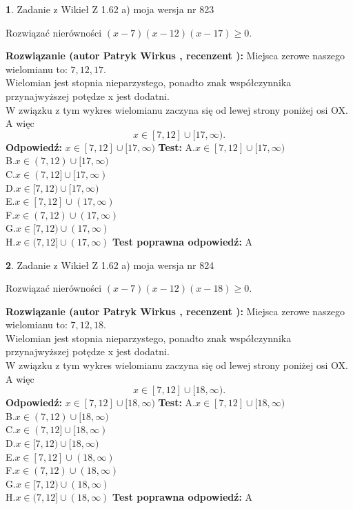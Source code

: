 \documentclass[12pt, a4paper]{article}
\theoremstyle{definition} %
\newtheorem{zad}{}
\newcommand{\zadStart}[1]{\begin{zad}#1\newline}
\newcommand{\zadStop}{\end{zad}}
\newcommand{\rozwStart}[2]{\noindent \textbf{Rozwiązanie (autor #1 , recenzent #2): }\newline}
\newcommand{\rozwStop}{\newline}
\newcommand{\odpStart}{\noindent \textbf{Odpowiedź:}\newline}
\newcommand{\odpStop}{\newline}
\newcommand{\testStart}{\noindent \textbf{Test:}\newline}
\newcommand{\testStop}{\newline}
\newcommand{\kluczStart}{\noindent \textbf{Test poprawna odpowiedź:}\newline}
\newcommand{\kluczStop}{\newline}
\begin{document}
\zadStart{Zadanie z Wikieł Z 1.62 a) moja wersja nr 823}

Rozwiązać nierówności $(x-7)(x-12)(x-17)\ge0$.
\zadStop
\rozwStart{Patryk Wirkus}{}
Miejsca zerowe naszego wielomianu to: $7, 12, 17$.\\
Wielomian jest stopnia nieparzystego, ponadto znak współczynnika przy\linebreak najwyższej potędze x jest dodatni.\\ W związku z tym wykres wielomianu zaczyna się od lewej strony poniżej osi OX. A więc $$x \in [7,12] \cup [17,\infty).$$
\rozwStop
\odpStart
$x \in [7,12] \cup [17,\infty)$
\odpStop
\testStart
A.$x \in [7,12] \cup [17,\infty)$\\
B.$x \in (7,12) \cup [17,\infty)$\\
C.$x \in (7,12] \cup [17,\infty)$\\
D.$x \in [7,12) \cup [17,\infty)$\\
E.$x \in [7,12] \cup (17,\infty)$\\
F.$x \in (7,12) \cup (17,\infty)$\\
G.$x \in [7,12) \cup (17,\infty)$\\
H.$x \in (7,12] \cup (17,\infty)$
\testStop
\kluczStart
A
\kluczStop



\zadStart{Zadanie z Wikieł Z 1.62 a) moja wersja nr 824}

Rozwiązać nierówności $(x-7)(x-12)(x-18)\ge0$.
\zadStop
\rozwStart{Patryk Wirkus}{}
Miejsca zerowe naszego wielomianu to: $7, 12, 18$.\\
Wielomian jest stopnia nieparzystego, ponadto znak współczynnika przy\linebreak najwyższej potędze x jest dodatni.\\ W związku z tym wykres wielomianu zaczyna się od lewej strony poniżej osi OX. A więc $$x \in [7,12] \cup [18,\infty).$$
\rozwStop
\odpStart
$x \in [7,12] \cup [18,\infty)$
\odpStop
\testStart
A.$x \in [7,12] \cup [18,\infty)$\\
B.$x \in (7,12) \cup [18,\infty)$\\
C.$x \in (7,12] \cup [18,\infty)$\\
D.$x \in [7,12) \cup [18,\infty)$\\
E.$x \in [7,12] \cup (18,\infty)$\\
F.$x \in (7,12) \cup (18,\infty)$\\
G.$x \in [7,12) \cup (18,\infty)$\\
H.$x \in (7,12] \cup (18,\infty)$
\testStop
\kluczStart
A
\kluczStop
\end{document}
